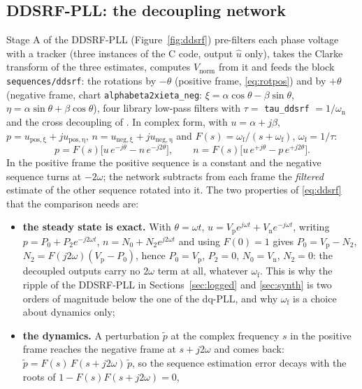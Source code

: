 \documentclass[11pt,a4paper]{scrartcl}
\newcommand{\ped}[1]{_{\mathrm{#1}}}
\newcommand{\code}[1]{\texttt{#1}}
\begin{document}
\begin{onehalfspace}
\subsection{DDSRF-PLL: the decoupling network}
\label{sec:ddsrf}

Stage A of the DDSRF-PLL (Figure~\ref{fig:ddsrf}) pre-filters each phase voltage with a tracker (three instances of the C code, output $\hat u$ only), takes the Clarke transform of the three estimates, computes $V\ped{norm}$ from it and feeds the block \code{sequences/ddsrf}: the rotations by $-\theta$ (positive frame, \eqref{eq:rotpos}) and by $+\theta$ (negative frame, chart \code{alphabeta2xieta\_neg}: $\xi = \alpha\cos\theta - \beta\sin\theta$, $\eta = \alpha\sin\theta + \beta\cos\theta$), four library low-pass filters with $\tau = $ \code{tau\_ddsrf} $= 1/\omega\ped{n}$ and the cross decoupling of \cite{rodriguez2007}. In complex form, with $u = \alpha + j\beta$, $p = u\ped{pos,\xi} + j u\ped{pos,\eta}$, $n = u\ped{neg,\xi} + j u\ped{neg,\eta}$ and $F(s) = \omega\ped{f}/(s + \omega\ped{f})$, $\omega\ped{f} = 1/\tau$:
\begin{equation}
	p = F(s)\Big[u\, e^{-j\theta} - n\, e^{-j2\theta}\Big], \qquad
	n = F(s)\Big[u\, e^{+j\theta} - p\, e^{+j2\theta}\Big].
	\label{eq:ddsrf}
\end{equation}
In the positive frame the positive sequence is a constant and the negative sequence turns at $-2\omega$; the network subtracts from each frame the \emph{filtered} estimate of the other sequence rotated into it. The two properties of \eqref{eq:ddsrf} that the comparison needs are:
\begin{itemize}[nosep]
	\item \textbf{the steady state is exact.} With $\theta = \omega t$, $u = V\ped{p} e^{j\omega t} + V\ped{n} e^{-j\omega t}$, writing $p = P_0 + P_2 e^{-j2\omega t}$, $n = N_0 + N_2 e^{j2\omega t}$ and using $F(0) = 1$ gives $P_0 = V\ped{p} - N_2$, $N_2 = F(j2\omega)(V\ped{p} - P_0)$, hence $P_0 = V\ped{p}$, $P_2 = 0$, $N_0 = V\ped{n}$, $N_2 = 0$: the decoupled outputs carry no $2\omega$ term at all, whatever $\omega\ped{f}$. This is why the ripple of the DDSRF-PLL in Sections~\ref{sec:logged} and \ref{sec:synth} is two orders of magnitude below the one of the dq-PLL, and why $\omega\ped{f}$ is a choice about dynamics only;
	\item \textbf{the dynamics.} A perturbation $\tilde p$ at the complex frequency $s$ in the positive frame reaches the negative frame at $s + j2\omega$ and comes back: $\tilde p = F(s)\,F(s+j2\omega)\,\tilde p$, so the sequence estimation error decays with the roots of $1 - F(s)F(s + j2\omega) = 0$,

\end{itemize}
\end{onehalfspace}
\end{document}
